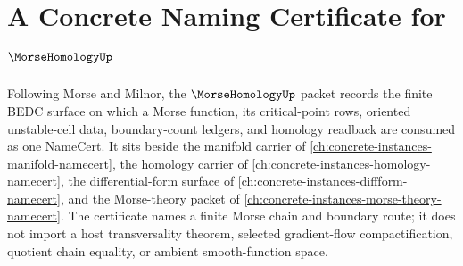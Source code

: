 \chapter{A Concrete Naming Certificate for $\MorseHomologyUp$}
\label{ch:concrete-instances-morse-homology-namecert}

Following Morse and Milnor, the $\MorseHomologyUp$ packet records the finite BEDC surface on which a Morse function, its critical-point rows, oriented unstable-cell data, boundary-count ledgers, and homology readback are consumed as one NameCert. It sits beside the manifold carrier of \autoref{ch:concrete-instances-manifold-namecert}, the homology carrier of \autoref{ch:concrete-instances-homology-namecert}, the differential-form surface of \autoref{ch:concrete-instances-diffform-namecert}, and the Morse-theory packet of \autoref{ch:concrete-instances-morse-theory-namecert}. The certificate names a finite Morse chain and boundary route; it does not import a host transversality theorem, selected gradient-flow compactification, quotient chain equality, or ambient smooth-function space.

